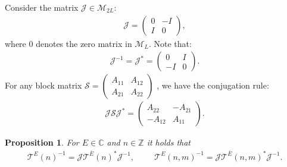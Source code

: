 \documentclass[12pt,oneside,onecolumn,open]{article}
\newtheorem{propo}[teo]{Proposition}
\begin{document}
Consider the  matrix $\mathcal{J} \in \mathcal{M}_{2L}$:
\begin{align}
    \mathcal{J} = \begin{pmatrix}
        0 & -I \\
        I & 0
    \end{pmatrix},
\end{align}
where $0$ denotes the zero matrix in $\mathcal{M}_L$. Note that:
\begin{align}
    \mathcal{J}^{-1} = \mathcal{J}^* = \begin{pmatrix}
        0 & I \\
        -I & 0
    \end{pmatrix}.
\end{align}
For any block matrix $
    \mathcal{S} = \begin{pmatrix}
        A_{11} & A_{12} \\
        A_{21} & A_{22} 
    \end{pmatrix}$ ,
we have the conjugation rule:
\begin{align}\label{irule}
    \mathcal{J} \mathcal{S} \mathcal{J}^* = \begin{pmatrix}
        A_{22} & -A_{21} \\
        -A_{12} & A_{11}
    \end{pmatrix}.
\end{align}
\begin{propo}\label{Uequivalence}
    For $E\in \mathbb{C}$ and $n\in \mathbb{Z}$ it holds that 
    \begin{align}
        \mathcal{T}^{E}(n)^{-1}=\mathcal{J}\mathcal{T}^{\overline{E}}(n)^{*}\mathcal{J}^{-1}, \hspace{1cm}
        \mathcal{T}^{E}(n,m)^{-1}=\mathcal{J}\mathcal{T}^{\overline{E}}(n,m)^{*}\mathcal{J}^{-1}.
    \end{align}
\end{propo}
\end{document}
